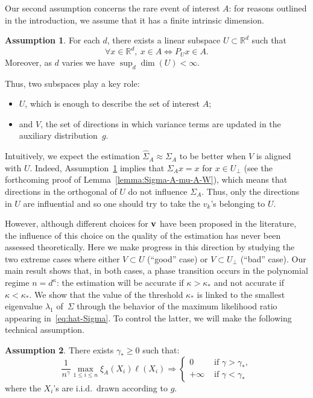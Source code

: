 \documentclass[]{article}
\newcommand{\R}{\mathbb{R}}
\theoremstyle{plain}
\theoremstyle{definition}
\newtheorem{assumption}{Assumption}
\begin{document}
Our second assumption concerns the rare event of interest $A$: for reasons outlined in the introduction, we assume that it has a finite intrinsic dimension.

\begin{assumption} \label{ass:FID}
	For each $d$, there exists a linear subspace $U \subset \R^d$ such that
	\begin{equation} \label{eq:FID}
		\forall x \in \R^d, \ x \in A \Leftrightarrow P_{U} x \in A.
	\end{equation}
	Moreover, as $d$ varies we have $\sup_d \dim(U) < \infty$.
\end{assumption}

Thus, two subspaces play a key role:
\begin{itemize}
	\item $U$, which is enough to describe the set of interest $A$;
	\item and $V$, the set of directions in which variance terms are updated in the auxiliary distribution~$g$. 
\end{itemize}
Intuitively, we expect the estimation $\hat \Sigma_A \approx \Sigma_A$ to be better when $V$ is aligned with $U$. Indeed, Assumption~\ref{ass:FID} implies that $\Sigma_A x = x$ for $x \in U_\perp$ (see the forthcoming proof of Lemma~\ref{lemma:Sigma-A-mu-A-W}), which means that directions in the orthogonal of $U$ do not influence $\Sigma_A$. Thus, only the directions in $U$ are influential and so one should try to take the $v_k$'s belonging to $U$. 

However, although different choices for $\bf v$ have been proposed in the literature, the influence of this choice on the quality of the estimation has never been assessed theoretically. Here we make progress in this direction by studying the two extreme cases where either $V \subset U$ (``good'' case) or $V \subset U_\perp$ (``bad'' case). Our main result shows that, in both cases, a phase transition occurs in the polynomial regime $n = d^\kappa$: the estimation will be accurate if $\kappa > \kappa_*$ and not accurate if $\kappa < \kappa_*$. We show that the value of the threshold $\kappa_*$ is linked to the smallest eigenvalue $\lambda_1$ of~$\Sigma$ through the behavior of the maximum likelihood ratio appearing in~\eqref{eq:hat-Sigma}. To control the latter, we will make the following technical assumption.





\begin{assumption} \label{ass:MW}
	There exists $\gamma_* \geq 0$ such that:
	\begin{equation} \label{eq:MW}
		\frac{1}{n^\gamma} \max_{1 \leq i \leq n} \xi_A(X_i) \ell(X_i) \Rightarrow \left\{ \begin{array}{ll} 0 & \text{ if } \gamma > \gamma_*,\\
		+\infty & \text{ if } \gamma < \gamma_* \end{array} \right.
	\end{equation}
	where the $X_i$'s are i.i.d.\ drawn according to $g$. 
\end{assumption}
\end{document}
